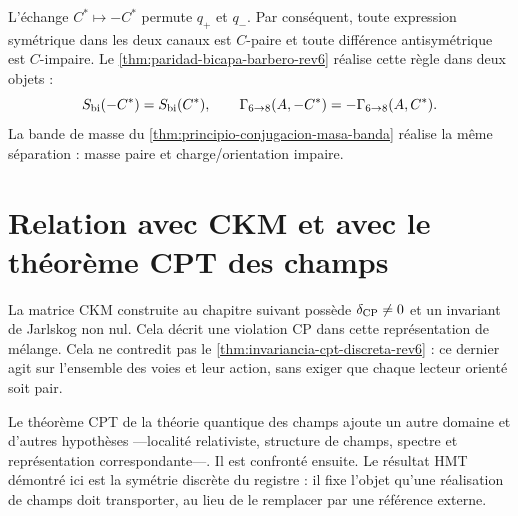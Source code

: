 L'échange \(C^*\mapsto-C^*\) permute \(q_+\) et \(q_-\). Par conséquent,
toute expression symétrique dans les deux canaux est \(C\)-paire et toute différence
antisymétrique est \(C\)-impaire. Le
\cref{thm:paridad-bicapa-barbero-rev6} réalise cette règle dans deux objets :
\[
 S_{\rm bi}(-C^*)=S_{\rm bi}(C^*),
 \qquad
 \Gamma_{6\to8}(A,-C^*)
 =-\Gamma_{6\to8}(A,C^*).
\]
La bande de masse du
\cref{thm:principio-conjugacion-masa-banda} réalise la même séparation :
masse paire et charge/orientation impaire.

\section{Relation avec CKM et avec le théorème CPT des champs}

La matrice CKM construite au chapitre suivant possède
\(\delta_{\rm CP}\neq0\) et un invariant de Jarlskog non nul. Cela décrit
une violation CP dans cette représentation de mélange. Cela ne contredit pas le
\cref{thm:invariancia-cpt-discreta-rev6} : ce dernier agit sur
l'ensemble des voies et leur action, sans exiger que chaque lecteur orienté soit pair.

Le théorème CPT de la théorie quantique des champs ajoute un autre domaine et d'autres
hypothèses ---localité relativiste, structure de champs, spectre et
représentation correspondante---. Il est confronté ensuite. Le résultat HMT
démontré ici est la symétrie discrète du registre : il fixe l'objet qu'une
réalisation de champs doit transporter, au lieu de le remplacer par une
référence externe.
